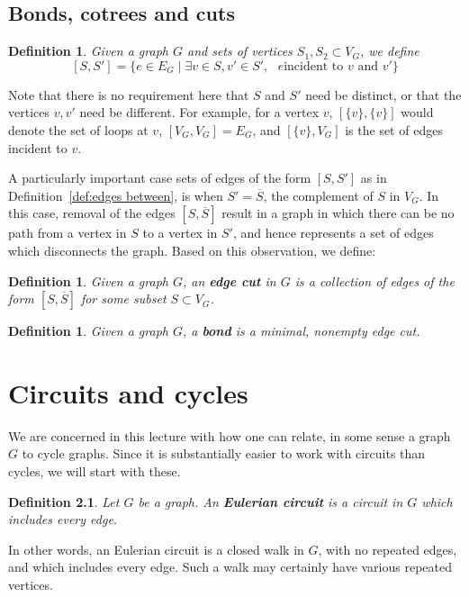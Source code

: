 \documentclass[12pt]{report}
\theoremstyle{plain}
\newtheorem{defn}[thm]{Definition}
\newcommand{\Xb}[1]{\textbf{#1}\index{#1}}
\begin{document}
\section{Bonds, cotrees and cuts}

\begin{defn} \label{edges between}
Given a graph $G$ and sets of vertices $S_1, S_2 \subset V_G$, we define
\[ [S, S'] = \{e \in E_G \mid \exists v \in S, v' \in S', \text{ $e$
incident to $v$ and $v'$}\}\]
\end{defn}
Note that there is no requirement here that $S$ and $S'$ need be distinct,
or that the vertices $v, v'$ need be different. For example, for a vertex
$v$, $[\{v\},\{v\}]$ would denote the set of loops at $v$, $[V_G, V_G]
= E_G$, and $[\{v\}, V_G]$ is the set of edges incident to $v$.

A particularly important case sets of edges of the form $[S, S']$ as in
Definition~\ref{def:edges between}, is when $S' = \overline S$, the
complement of $S$ in $V_G$. In this case, removal of the edges $[S,
\overline S]$ result in a graph in which there can be no path from a vertex
in $S$ to a vertex in $S'$, and hence represents a set of edges which
disconnects the graph. Based on this observation, we define:

\begin{defn} \label{def:edge cut}
Given a graph $G$, an \Xb{edge cut} in $G$ is a collection of edges of the
form $[S, \overline S]$ for some subset $S \subset V_G$.
\end{defn}

\begin{defn} \label{def:bond}
Given a graph $G$, a \Xb{bond} is a minimal, nonempty edge cut.
\end{defn}


\chapter{Circuits and cycles}

We are concerned in this lecture with how one can relate, in some sense a
graph $G$ to cycle graphs. Since it is substantially easier to work with
circuits than cycles, we will start with these.

\begin{defn}
Let $G$ be a graph. An \textbf{Eulerian circuit} is
a circuit in $G$ which includes every edge.
\end{defn}
In other words, an Eulerian circuit is a closed walk in $G$, with no
repeated edges, and which includes every edge. Such a walk may certainly
have various repeated vertices.
\end{document}
